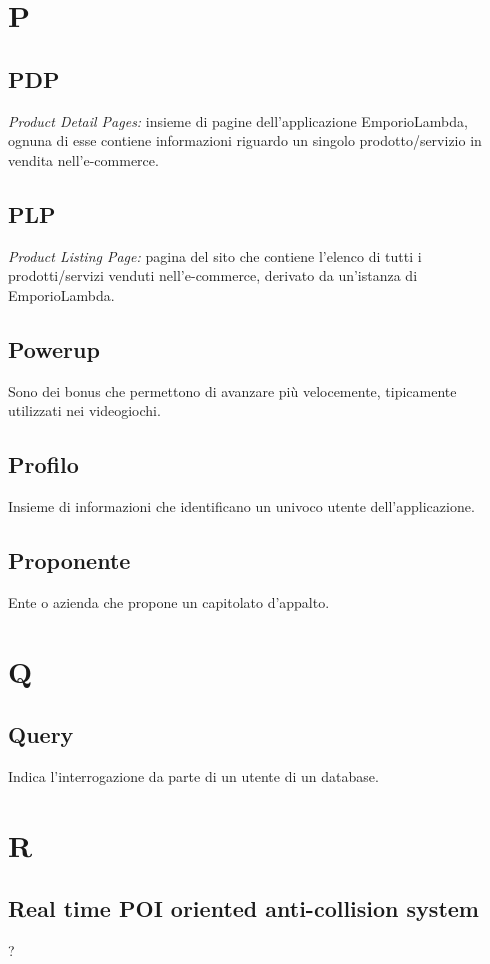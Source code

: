 \section*{P}
\subsection*{PDP}
\textit{Product Detail Pages:} insieme di pagine dell'applicazione EmporioLambda, ognuna di esse contiene informazioni riguardo un singolo prodotto/servizio in vendita nell'e-commerce.

\subsection*{PLP}
\textit{Product Listing Page:} pagina del sito che contiene l'elenco di tutti i prodotti/servizi venduti nell'e-commerce, derivato da un'istanza di EmporioLambda.

\subsection*{Powerup}
Sono dei bonus che permettono di avanzare più velocemente, tipicamente utilizzati nei videogiochi.

\subsection*{Profilo}
Insieme di informazioni che identificano un univoco utente dell'applicazione.

\subsection*{Proponente}
Ente o azienda che propone un capitolato d'appalto.

\section*{Q}
\subsection*{Query}
Indica l'interrogazione da parte di un utente di un database.

\section*{R}
\subsection*{Real time POI oriented anti-collision system}
?

